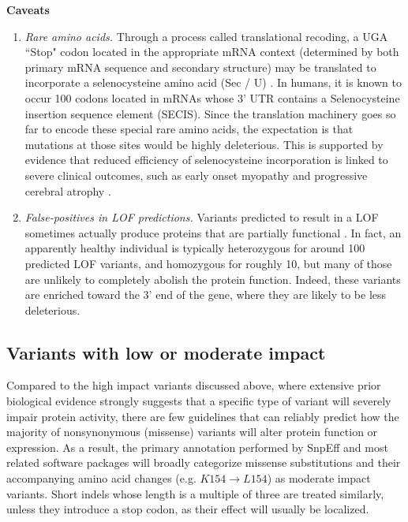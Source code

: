 \textbf{Caveats}
	\begin{enumerate}[label=\roman*]
	
	\item \textit{Rare amino acids.} Through a process called translational recoding, a UGA ``Stop" codon located in the appropriate mRNA context (determined by both primary mRNA sequence and secondary structure) may be translated to incorporate a selenocysteine amino acid (Sec / U) \cite{alberts1995molecular}. In humans, it is known to occur 100 codons located in mRNAs whose 3' UTR contains a Selenocysteine insertion sequence element (SECIS). Since the translation machinery goes so far to encode these special rare amino acids, the expectation is that mutations at those sites would be highly deleterious. This is supported by evidence that reduced efficiency of selenocysteine incorporation is linked to severe clinical outcomes, such as early onset myopathy  \cite{maiti2009mutation} and progressive cerebral atrophy  \cite{agamy2010mutations}.
	
	\item \textit{False-positives in LOF predictions.} Variants predicted to result in a LOF sometimes actually produce proteins that are partially functional  \cite{macarthur2012systematic}. In fact, an apparently healthy individual is typically heterozygous for around 100 predicted LOF variants, and homozygous for roughly 10, but many of those are unlikely to completely abolish the protein function. Indeed, these variants are enriched toward the 3' end of the gene, where they are likely to be less deleterious. 
	
	\end{enumerate}

\subsection{Variants with low or moderate impact}

Compared to the high impact variants discussed above, where extensive prior biological evidence strongly suggests that a specific type of variant will severely impair protein activity, there are few guidelines that can reliably predict how the majority of nonsynonymous (missense) variants will alter protein function or expression. As a result, the primary annotation performed by SnpEff and most related software packages will broadly categorize missense substitutions and their accompanying amino acid changes (e.g. $K154 \rightarrow L154$) as moderate impact variants. Short indels whose length is a multiple of three are treated similarly, unless they introduce a stop codon, as their effect will usually be localized.

